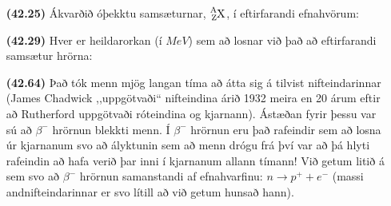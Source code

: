 \ifdefined \wholebook \else\documentclass[oneside]{book}\usepackage{EdlBook}\graphicspath{{figures/}}
\begin{document}
\begin{enumerate}[label = \textbf{(\alph*)}]

\item[\textbf{(42.25)}] Ákvarðið óþekktu samsæturnar, $\ce{^{A}_{Z}X}$, í eftirfarandi efnahvörum: \\


\phantom{.}


\item[\textbf{(42.29)}] Hver er heildarorkan (í $\si{MeV}$) sem að losnar við það að eftirfarandi samsætur hrörna: 

\item[\textbf{(42.64)}] Það tók menn mjög langan tíma að átta sig á tilvist nifteindarinnar (James Chadwick ,,uppgötvaði`` nifteindina árið 1932 meira en 20 árum eftir að Rutherford uppgötvaði róteindina og kjarnann). Ástæðan fyrir þessu var sú að $\beta^-$ hrörnun blekkti menn. Í $\beta^-$ hrörnun eru það rafeindir sem að losna úr kjarnanum svo að ályktunin sem að menn drógu frá því var að þá hlyti rafeindin að hafa verið þar inni í kjarnanum allann tímann! Við getum litið á sem svo að $\beta^-$ hrörnun samanstandi af efnahvarfinu: $n \to p^+ + e^-$ (massi andnifteindarinnar er svo lítill að við getum hunsað hann). 


\end{enumerate}
\end{document}
